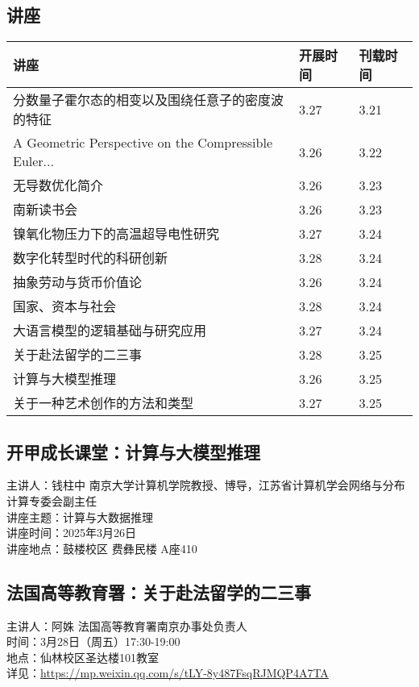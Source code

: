 \documentclass[letterpaper, 12pt]{article}
\begin{document}
\begin{multicols}{2}
\pagebreak

\section{讲座}
\begin{tabular}{|>{\centering\arraybackslash}m{}|m{}|m{}|}
    \hline
    讲座 & 开展时间 & 刊载时间\\
    \hline\hline
    分数量子霍尔态的相变以及围绕任意子的密度波的特征 & 3.27 & 3.21\\\hline
    A Geometric Perspective on the Compressible Euler... & 3.26 & 3.22\\\hline
    无导数优化简介 & 3.26 & 3.23\\\hline
    南新读书会 & 3.26 & 3.23\\\hline
    镍氧化物压力下的高温超导电性研究 & 3.27 & 3.24\\\hline
    数字化转型时代的科研创新 & 3.28 & 3.24\\\hline
    抽象劳动与货币价值论 & 3.26 & 3.24\\\hline
    国家、资本与社会 & 3.28 & 3.24\\\hline
    大语言模型的逻辑基础与研究应用 & 3.27 & 3.24\\\hline
    关于赴法留学的二三事 & 3.28 & 3.25\\\hline
    计算与大模型推理 & 3.26 & 3.25\\\hline
    关于一种艺术创作的方法和类型 & 3.27 & 3.25\\\hline
\end{tabular}
\subsection{开甲成长课堂：计算与大模型推理}
主讲人：钱柱中 南京大学计算机学院教授、博导，江苏省计算机学会网络与分布计算专委会副主任\\
讲座主题：计算与大数据推理\\
讲座时间：2025年3月26日\\
讲座地点：鼓楼校区 费彝民楼 A座410\\

\subsection{法国高等教育署：关于赴法留学的二三事}
主讲人：阿姝 法国高等教育署南京办事处负责人
\\时间：3月28日（周五）17:30-19:00
\\地点：仙林校区圣达楼101教室
\\详见：\url{https://mp.weixin.qq.com/s/tLY-8y487FsqRJMQP4A7TA}

\end{multicols}
\end{document}
